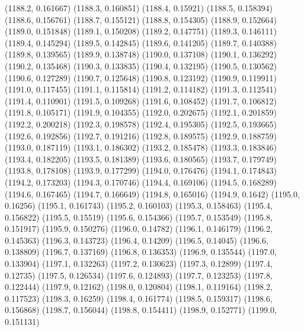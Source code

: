 {					(1188.2, 0.161667)
					(1188.3, 0.160851)
					(1188.4, 0.15921)
					(1188.5, 0.158394)
					(1188.6, 0.156761)
					(1188.7, 0.155121)
					(1188.8, 0.154305)
					(1188.9, 0.152664)
					(1189.0, 0.151848)
					(1189.1, 0.150208)
					(1189.2, 0.147751)
					(1189.3, 0.146111)
					(1189.4, 0.145294)
					(1189.5, 0.142845)
					(1189.6, 0.141205)
					(1189.7, 0.140388)
					(1189.8, 0.139565)
					(1189.9, 0.138748)
					(1190.0, 0.137108)
					(1190.1, 0.136292)
					(1190.2, 0.135468)
					(1190.3, 0.133835)
					(1190.4, 0.132195)
					(1190.5, 0.130562)
					(1190.6, 0.127289)
					(1190.7, 0.125648)
					(1190.8, 0.123192)
					(1190.9, 0.119911)
					(1191.0, 0.117455)
					(1191.1, 0.115814)
					(1191.2, 0.114182)
					(1191.3, 0.112541)
					(1191.4, 0.110901)
					(1191.5, 0.109268)
					(1191.6, 0.108452)
					(1191.7, 0.106812)
					(1191.8, 0.105171)
					(1191.9, 0.104355)
					(1192.0, 0.202675)
					(1192.1, 0.201859)
					(1192.2, 0.200218)
					(1192.3, 0.198578)
					(1192.4, 0.195305)
					(1192.5, 0.193665)
					(1192.6, 0.192856)
					(1192.7, 0.191216)
					(1192.8, 0.189575)
					(1192.9, 0.188759)
					(1193.0, 0.187119)
					(1193.1, 0.186302)
					(1193.2, 0.185478)
					(1193.3, 0.183846)
					(1193.4, 0.182205)
					(1193.5, 0.181389)
					(1193.6, 0.180565)
					(1193.7, 0.179749)
					(1193.8, 0.178108)
					(1193.9, 0.177299)
					(1194.0, 0.176476)
					(1194.1, 0.174843)
					(1194.2, 0.173203)
					(1194.3, 0.170746)
					(1194.4, 0.169106)
					(1194.5, 0.168289)
					(1194.6, 0.167465)
					(1194.7, 0.166649)
					(1194.8, 0.165016)
					(1194.9, 0.1642)
					(1195.0, 0.16256)
					(1195.1, 0.161743)
					(1195.2, 0.160103)
					(1195.3, 0.158463)
					(1195.4, 0.156822)
					(1195.5, 0.15519)
					(1195.6, 0.154366)
					(1195.7, 0.153549)
					(1195.8, 0.151917)
					(1195.9, 0.150276)
					(1196.0, 0.14782)
					(1196.1, 0.146179)
					(1196.2, 0.145363)
					(1196.3, 0.143723)
					(1196.4, 0.14209)
					(1196.5, 0.14045)
					(1196.6, 0.138809)
					(1196.7, 0.137169)
					(1196.8, 0.136353)
					(1196.9, 0.135544)
					(1197.0, 0.133904)
					(1197.1, 0.132263)
					(1197.2, 0.130623)
					(1197.3, 0.12899)
					(1197.4, 0.12735)
					(1197.5, 0.126534)
					(1197.6, 0.124893)
					(1197.7, 0.123253)
					(1197.8, 0.122444)
					(1197.9, 0.12162)
					(1198.0, 0.120804)
					(1198.1, 0.119164)
					(1198.2, 0.117523)
					(1198.3, 0.16259)
					(1198.4, 0.161774)
					(1198.5, 0.159317)
					(1198.6, 0.156868)
					(1198.7, 0.156044)
					(1198.8, 0.154411)
					(1198.9, 0.152771)
					(1199.0, 0.151131)
}
